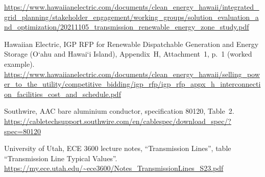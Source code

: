 \documentclass[11pt,a4paper]{article}
\newcommand{\okina}{\textquoteleft}
\newcommand{\Oahu}{O\okina ahu}
\begin{document}
\begin{small}
\begin{description}[leftmargin=4.2em,style=sameline,itemsep=2pt]
  \url{https://www.hawaiianelectric.com/documents/clean_energy_hawaii/integrated_grid_planning/stakeholder_engagement/working_groups/solution_evaluation_and_optimization/20211105_transmission_renewable_energy_zone_study.pdf}
\item[{[RFP]}] Hawaiian Electric, IGP RFP for Renewable Dispatchable Generation and
  Energy Storage (\Oahu{} and Hawai\okina i Island), Appendix~H, Attachment~1, p.~1
  (worked example).
  \url{https://www.hawaiianelectric.com/documents/clean_energy_hawaii/selling_power_to_the_utility/competitive_bidding/igp_rfp/igp_rfp_appx_h_interconnection_facilities_cost_and_schedule.pdf}
\item[{[SW]}] Southwire, AAC bare aluminium conductor, specification 80120, Table~2.
  \url{https://cabletechsupport.southwire.com/en/cablespec/download_spec/?spec=80120}
\item[{[UT]}] University of Utah, ECE 3600 lecture notes, ``Transmission Lines'', table
  ``Transmission Line Typical Values''.
  \url{https://my.ece.utah.edu/~ece3600/Notes_TransmissionLines_S23.pdf}
\end{description}
\end{small}
\end{document}

